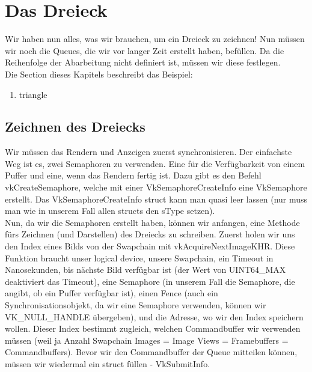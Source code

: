 \documentclass[11pt,a4paper]{report}
\begin{document}
\chapter{Das Dreieck}
Wir haben nun alles, was wir brauchen, um ein Dreieck zu zeichnen! Nun müssen wir noch die Queues, die wir vor langer Zeit erstellt haben, befüllen. Da die Reihenfolge der Abarbeitung nicht definiert ist, müssen wir diese festlegen.\\
Die Section dieses Kapitels beschreibt das Beispiel:
\begin{enumerate}
	\item{triangle}
\end{enumerate}

\section{Zeichnen des Dreiecks}
Wir müssen das Rendern und Anzeigen zuerst synchronisieren. Der einfachste Weg ist es, zwei Semaphoren zu verwenden. Eine für die Verfügbarkeit von einem Puffer und eine, wenn das Rendern fertig ist. Dazu gibt es den Befehl vkCreateSemaphore, welche mit einer VkSemaphoreCreateInfo eine VkSemaphore erstellt. Das VkSemaphoreCreateInfo struct kann man quasi leer lassen (nur muss man wie in unserem Fall allen structs den sType setzen).\\
Nun, da wir die Semaphoren erstellt haben, können wir anfangen, eine Methode fürs Zeichnen (und Darstellen) des Dreiecks zu schreiben. Zuerst holen wir uns den Index eines Bilds von der Swapchain mit vkAcquireNextImageKHR. Diese Funktion braucht unser logical device, unsere Swapchain, ein Timeout in Nanosekunden, bis nächste Bild verfügbar ist (der Wert von UINT64\_MAX deaktiviert das Timeout), eine Semaphore (in unserem Fall die Semaphore, die angibt, ob ein Puffer verfügbar ist), einen Fence (auch ein Synchronisationsobjekt, da wir eine Semaphore verwenden, können wir VK\_NULL\_HANDLE übergeben), und die Adresse, wo wir den Index speichern wollen. Dieser Index bestimmt zugleich, welchen Commandbuffer wir verwenden müssen (weil ja Anzahl Swapchain Images = Image Views = Framebuffers = Commandbuffers). Bevor wir den Commandbuffer der Queue mitteilen können, müssen wir wiedermal ein struct füllen - VkSubmitInfo.\\
\end{document}
